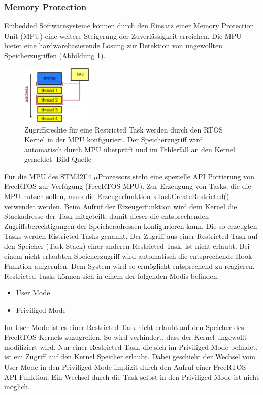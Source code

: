 \subsubsection{Memory Protection}
\label{sec:Memory Protection}
Embedded Softwaresysteme können durch den Einsatz einer Memory Protection Unit (MPU) eine weitere Steigerung der Zuverlässigkeit erreichen. Die MPU bietet eine hardwarebasierende Lösung zur Detektion von ungewollten Speicherzugriffen (Abbildung \ref{fig:AddressSpaceMMU}). 
\begin{figure}[htb]
	\centering
		\includegraphics[width=0.3\textwidth]{Pictures/EmbeddedCom/addressSpaceMMU}
	\caption{Zugriffsrechte für eine Restricted Task werden durch den RTOS Kernel in der MPU konfiguriert. Der Speicherzugriff wird automatisch durch MPU überprüft und im Fehlerfall an den Kernel gemeldet. Bild-Quelle~\protect{}}
	\label{fig:AddressSpaceMMU}
\end{figure} 
Für die MPU des STM32F4 $\mu$\-Pro\-zesso\-rs steht eine spezielle API Portierung von FreeRTOS zur Verfügung (FreeRTOS-MPU). Zur Erzeugung von Tasks, die die MPU nutzen sollen, muss die Erzeugerfunktion xTaskCreateRestricted() verwendet werden. Beim Aufruf der Erzeugerfunktion wird dem Kernel die Stackadresse der Task mitgeteilt, damit dieser die entsprechenden Zugriffsberechtigungen der Speicheradressen konfigurieren kann. Die so erzeugten Tasks werden Ristricted Tasks genannt. Der Zugriff aus einer Restricted Task auf den Speicher (Task-Stack) einer anderen Restricted Task, ist nicht erlaubt. Bei einem nicht erlaubten Speicherzugriff wird automatisch die entsprechende Hook-Funktion aufgerufen. Dem System wird so ermöglicht entsprechend zu reagieren. Restricted Tasks können sich in einem der folgenden Modis befinden:
\begin{itemize}
	\item User Mode
	\item Priviliged Mode 
\end{itemize}
Im User Mode ist es einer Restricted Task nicht erlaubt auf den Speicher des FreeRTOS Kernels zuzugreifen. So wird verhindert, dass der Kernel ungewollt modifiziert wird. Nur einer Restricted Task, die sich im Priviliged Mode befindet, ist ein Zugriff auf den Kernel Speicher erlaubt. Dabei geschieht der Wechsel vom User Mode in den Priviliged Mode implizit durch den Aufruf einer FreeRTOS API Funktion. Ein Wechsel durch die Task selbst in den Priviliged Mode ist nicht möglich.
